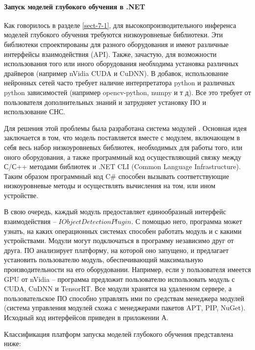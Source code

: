 \paragraph{Запуск моделей глубокого обучения в .NET}

Как говорилось в разделе \ref{sect-7-1}, для высокопроизводительного инференса моделей глубокого обучения требуются низкоуровневые библиотеки. Эти библиотеки спроектированы для разного оборудования и имеют различные интерфейсы взаимодействия (API). Также, зачастую, для возможности использования того или иного оборудования необходима установка различных драйверов (например nVidia CUDA и CuDNN). В добавок, использование нейронных сетей часто требует наличие интерпретатора python и различных python зависимостей (например opencv-python, numpy и т д). Все это требует от пользователя дополнительных знаний и затрудняет установку ПО и использование СНС.

Для решения этой проблемы была разработана система модулей \cite{lib-plugins}. Основная идея заключается в том, что модель поставляется вместе с модулем, включающем в себя весь набор низкоуровневых библиотек, необходимых для работы того, или оного оборудования, а также программный код осуществляющий связку между С\slash С++ методами библиотек и .NET CLI (Common Language Infrastructure). Таким образом программный код C\# способен вызывать соответствующие низкоуровневые методы и осуществлять вычисления на том, или ином устройстве.

В свою очередь, каждый модуль предоставляет единообразный интерфейс взаимодействия -- $IObjectDetectionPlugin$. С помощью него, программа может узнать, на каких операционных системах способен работать модуль и с какими устройствами. Модули могут подключаться в программу независимо друг от друга. ПО анализирует платформу, на которой оно запущено, и предлагает установить пользователю модуль, обеспечивающий максимальную производительности на его оборудовании. Например, если у пользователя имеется GPU от nVidia -- программа предложит пользователю использовать модуль с CUDA, CuDNN и TensorRT. Все модули хранятся на удаленном сервере, а пользовательское ПО способно управлять ими по средствам менеджера модулей (система управления модулей схожа с менеджерами пакетов APT, PIP, NuGet). Исходный код интерфейсов приведен в приложении А.

Классификация платформ запуска моделей глубокого обучения представлена ниже:

